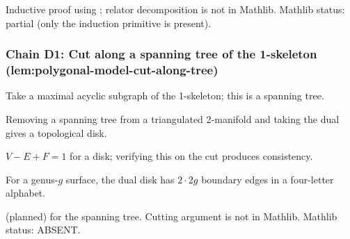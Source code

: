 \begin{lemma}
\label{lem:tsh-r5}
Inductive proof using ; relator decomposition is not in Mathlib.  Mathlib status: partial (only the induction primitive is present).
\leanok
\end{lemma}

\subsubsection*{Chain D1: Cut along a spanning tree of the 1-skeleton (lem:polygonal-model-cut-along-tree)}

\begin{lemma}
\label{lem:pct-r1}
Take a maximal acyclic subgraph of the 1-skeleton; this is a spanning tree.
\leanok
\end{lemma}

\begin{lemma}
\label{lem:pct-r2}
Removing a spanning tree from a triangulated 2-manifold and taking the dual gives a topological disk.
\leanok
\end{lemma}

\begin{lemma}
\label{lem:pct-r3}
$V - E + F = 1$ for a disk; verifying this on the cut produces consistency.
\leanok
\end{lemma}

\begin{lemma}
\label{lem:pct-r4}
For a genus-$g$ surface, the dual disk has $2 \cdot 2g$ boundary edges in a four-letter alphabet.
\leanok
\end{lemma}

\begin{lemma}
\label{lem:pct-r5}
 (planned) for the spanning tree.  Cutting argument is not in Mathlib.  Mathlib status: ABSENT.
\leanok
\end{lemma}

